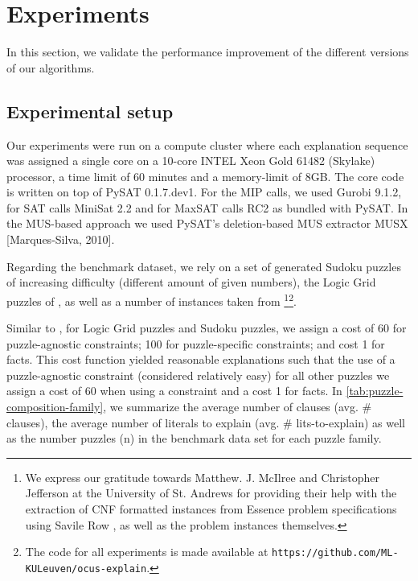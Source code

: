 \documentclass[a4paper,UKenglish,cleveref, autoref, thm-restate, pdfa]{lipics-v2021}
\renewcommand\comment[1]{}
\newcommand{\tias}[1]{{\comment{\color{blue}Tias:#1}}}
\begin{document}
	\section{Experiments}\label{sec:experiments}
	
	In this section, we validate the performance improvement of the different versions of our algorithms.
	
	\subsection*{Experimental setup}
	
	Our experiments were run on a compute cluster where each explanation sequence was assigned a single core on a 10-core INTEL Xeon Gold 61482 (Skylake) processor, a time limit of 60 minutes and a memory-limit of 8GB. The core code is written on top of PySAT 0.1.7.dev1.
	For the MIP calls, we used Gurobi 9.1.2, for SAT calls MiniSat 2.2 and for MaxSAT calls RC2 as bundled with PySAT.
	In the MUS-based approach we used PySAT’s deletion-based MUS extractor MUSX [Marques-Silva, 2010].
	
	Regarding the benchmark dataset, we rely on a set of generated Sudoku puzzles of increasing difficulty (different amount of given numbers), the Logic Grid puzzles of \cite{bogaerts2021framework}, as well as a number of instances taken from \cite{schotten}\footnote{We express our gratitude towards Matthew. J. McIlree and Christopher Jefferson at the University of St. Andrews for providing their help with the extraction of CNF formatted instances from Essence problem specifications \cite{frisch2008essence} using Savile Row \cite{nightingale2017automatically}, as well as the problem instances themselves.}\footnote{The code for all experiments is made available at \texttt{https://github.com/ML-KULeuven/ocus-explain}.}. 
	
	Similar to \cite{ijcai2021}, for Logic Grid puzzles and Sudoku puzzles, we assign a cost of 60 for puzzle-agnostic constraints; 100 for puzzle-specific constraints; and cost 1 for facts.
	This cost function yielded reasonable explanations such that the use of a puzzle-agnostic constraint (considered relatively easy) for all other puzzles we assign a cost of 60 when using a constraint and a cost 1 for facts.
	In \cref{tab:puzzle-composition-family}, we summarize the average number of clauses (avg. $\#$ {clauses}), the average number of literals to explain (avg. $\#$ lits-to-explain) as well as the number puzzles (n) in the benchmark data set for each puzzle family. 
	
\end{document}
